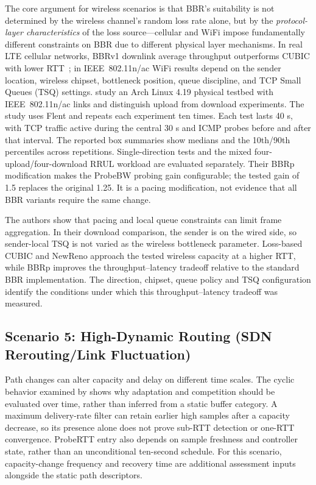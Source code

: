 \documentclass[a4paper,fleqn]{cas-sc}
\begin{document}
The core argument for wireless scenarios is that BBR's suitability is not
determined by the wireless channel's random loss rate alone, but by the
\emph{protocol-layer characteristics} of the loss source---cellular and WiFi
impose fundamentally different constraints on BBR due to different physical layer
mechanisms. In real LTE cellular networks, BBRv1 downlink average throughput
outperforms CUBIC with lower RTT~\citep{atxutegi2018cellular}; in IEEE~802.11n/ac
WiFi results depend on the sender location, wireless chipset, bottleneck
position, queue discipline, and TCP Small Queues (TSQ) settings.
\citet{grazia2020bbrp} study an Arch Linux 4.19 physical testbed with
IEEE~802.11n/ac links and distinguish upload from download experiments.
The study uses Flent and repeats each experiment ten times. Each test
lasts 40 s, with TCP traffic active during the central 30 s and ICMP
probes before and after that interval. The reported box summaries show
medians and the 10th/90th percentiles across repetitions.
Single-direction tests and the mixed four-upload/four-download RRUL
workload are evaluated separately. Their BBRp modification makes the
ProbeBW probing gain configurable;
the tested gain of 1.5 replaces the original 1.25. It is a pacing modification,
not evidence that all BBR variants require the same change.

The authors show that pacing and local queue constraints can limit frame
aggregation. In their download comparison, the sender is on the wired side,
so sender-local TSQ is not varied as the wireless bottleneck parameter.
Loss-based CUBIC and NewReno approach the tested wireless capacity at a
higher RTT, while BBRp improves the throughput--latency tradeoff relative
to the standard BBR implementation. The direction, chipset, queue policy and TSQ configuration identify the
conditions under which this throughput--latency tradeoff was measured.

\FloatBarrier

\subsection{Scenario 5: High-Dynamic Routing (SDN Rerouting/Link Fluctuation)}
\label{sec:sdn}

Path changes can alter capacity and delay on different time scales. The
cyclic behavior examined by \citet{miyazawa2018cyclic,miyazawa2020mechanism}
shows why adaptation and competition should be evaluated over time,
rather than inferred from a static buffer category. A maximum delivery-rate
filter can retain earlier high samples after a capacity decrease, so its
presence alone does not prove sub-RTT detection or one-RTT convergence.
ProbeRTT entry also depends on sample freshness and controller state,
rather than an unconditional ten-second schedule. For this scenario,
capacity-change frequency and recovery time are additional assessment
inputs alongside the static path descriptors.
\end{document}
